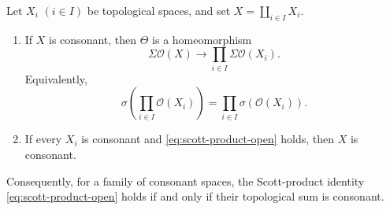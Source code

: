 \documentclass[10pt,a4paper]{amsart}
\newcommand{\OO}{\mathcal O}
\begin{document}
\begin{theorem}\label{thm:consonance-characterization}
Let $X_i$ $(i\in I)$ be topological spaces, and set
$X=\coprod_{i\in I}X_i$.
\begin{enumerate}
\item If $X$ is consonant, then $\Theta$ is a homeomorphism
\[
   \Sigma\OO(X)\longrightarrow\prod_{i\in I}\Sigma\OO(X_i).
\]
Equivalently,
\begin{equation}\label{eq:scott-product-open}
  \sigma\!\left(\prod_{i\in I}\OO(X_i)\right)
  =\prod_{i\in I}\sigma(\OO(X_i)).
\end{equation}
\item If every $X_i$ is consonant and \eqref{eq:scott-product-open} holds,
then $X$ is consonant.
\end{enumerate}
Consequently, for a family of consonant spaces, the Scott-product identity
\eqref{eq:scott-product-open} holds if and only if their topological sum is
consonant.
\end{theorem}
\end{document}
